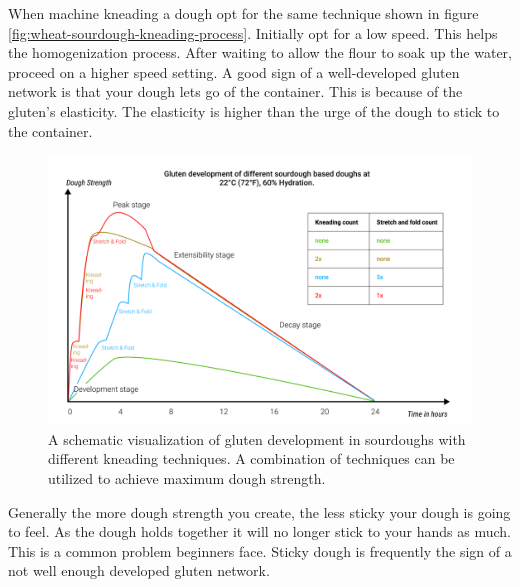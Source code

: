 When machine kneading a dough opt for the same technique shown in figure \ref*{fig:wheat-sourdough-kneading-process}.
Initially opt for a low speed. This helps the homogenization process.
After waiting to allow the flour to soak up the water, proceed on a higher speed
setting. A good sign of a well-developed gluten network is
that your dough lets go of the container. This is because of the gluten's elasticity.
The elasticity is higher than the urge of the
dough to stick to the container.

\begin{figure}[!htb]
  \includegraphics[width=\textwidth]{dough-strength-sourdough}
  \caption{A schematic visualization of
  gluten development in sourdoughs with different kneading techniques.
  A combination of techniques can be utilized to achieve maximum
  dough strength.
  }
  \label{fig:dough-strength-sourdough}
\end{figure}

Generally the more dough strength you create, the less sticky your dough is going to
feel. As the dough holds together it will no longer stick to your hands as
much. This is a common problem beginners face. Sticky dough is frequently
the sign of a not well enough developed gluten network.

